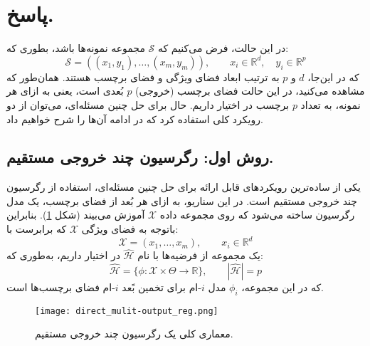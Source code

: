 \section{پاسخ.}

	\begin{redtext}
	در این حالت، فرض می‌کنیم که $\mathcal{S}$ مجموعه نمونه‌ها باشد، بطوری که:
		\begin{equation*}
			\mathcal{S} = ((x_1, y_1), \dots, (x_m, y_m)), \quad\quad x_i \in \mathbb{R}^d, \quad y_i \in \mathbb{R}^p
		\end{equation*}
	که در این‌جا، $d$ و $p$ به ترتیب ابعاد فضای ویژگی و فضای برچسب هستند. همان‌طور که مشاهده می‌کنید، در این حالت فضای برچسب (خروجی) $p$ بُعدی است، یعنی به ازای هر نمونه، به تعداد $p$ برچسب در اختیار داریم. حال برای حل چنین مسئله‌ای، می‌توان از دو رویکرد کلی استفاده کرد که در ادامه آن‌ها را شرح خواهیم داد.
		
		\subsection*{روش اول: رگرسیون چند خروجی مستقیم.}
			یکی از ساده‌ترین رویکردهای قابل ارائه برای حل چنین مسئله‌ای، استفاده از رگرسیون چند خروجی مستقیم است. در این سناریو، به ازای هر بُعد از فضای برچسب، یک مدل رگرسیون ساخته می‌شود که روی مجموعه داده $\mathcal{X}$ آموزش می‌بیند (شکل \ref{fig2}). بنابراین باتوجه به فضای ویژگی $\mathcal{X}$ که برابرست با:
			\begin{equation*}
				\mathcal{X} = (x_1, \dots, x_m), \quad\quad x_i \in \mathbb{R}^d
			\end{equation*}
			یک مجموعه از فرضیه‌ها با نام $\mathcal{\hat{H}}$ در اختیار داریم، به‌طوری که:
			\begin{equation*}
				\mathcal{\hat{H}} = \big\{ \phi: \mathcal{X} \times \Theta \rightarrow \mathbb{R} \big\}, \quad\quad | \mathcal{\hat{H}} | = p
			\end{equation*}
			که در این مجموعه، $\phi_i$ مدل $i$-ام برای تخمین بًعد $i$-ام فضای برچسب‌ها است.
			
			\begin{figure}[h]
				\centering
				\texttt{[image: direct\_mulit-output\_reg.png]}
				\caption{معماری کلی یک رگرسیون چند خروجی مستقیم.}
				\label{fig2}
			\end{figure}
		

\end{redtext}
